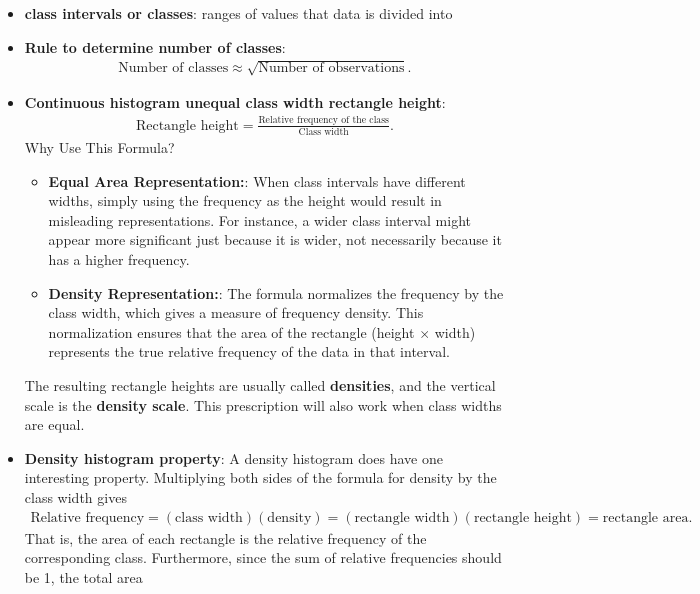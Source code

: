 \documentclass{report}
\begin{document}
\begin{itemize}
        \item \textbf{class intervals or classes}: ranges of values that data is divided into
        \item \textbf{Rule to determine number of classes}: 
            \begin{align*}
                \text{Number of classes} \approx \sqrt{\text{Number of observations}}
            .\end{align*}
        \item \textbf{Continuous histogram unequal class width rectangle height}:
            \begin{align*}
                \text{Rectangle height} = \frac{\text{Relative frequency of the class}}{\text{Class width}}
            .\end{align*}
            Why Use This Formula?
            \begin{itemize}
                \item \textbf{Equal Area Representation:}: When class intervals have different widths, simply using the frequency as the height would result in misleading representations. For instance, a wider class interval might appear more significant just because it is wider, not necessarily because it has a higher frequency.
                \item \textbf{Density Representation:}: The formula normalizes the frequency by the class width, which gives a measure of frequency density. This normalization ensures that the area of the rectangle (height $\times$ width) represents the true relative frequency of the data in that interval.
            \end{itemize}
            The resulting rectangle heights are usually called \textbf{densities}, and the vertical
            scale is the \textbf{density scale}. This prescription will also work when class widths are equal.
        \item \textbf{Density histogram property}: A density histogram does have one interesting property. Multiplying both sides of the formula for density by the class width gives
            \begin{align*}
                \text{Relative frequency} = (\text{class width})(\text{density}) = (\text{rectangle width})(\text{rectangle height}) = \text{rectangle area}
            .\end{align*}
            That is, the area of each rectangle is the relative frequency of the corresponding
            class. Furthermore, since the sum of relative frequencies should be 1, the total area

\end{itemize}
\end{document}
